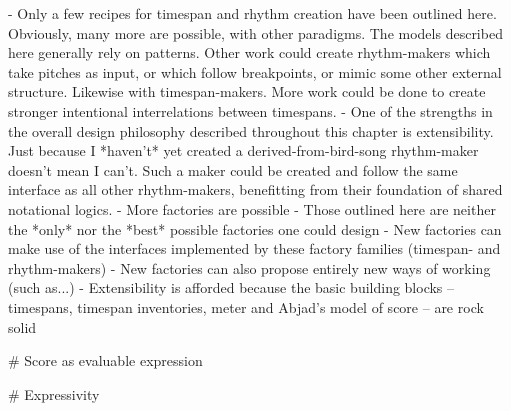 \begin{markdown}
- Only a few recipes for timespan and rhythm creation have been outlined
  here. Obviously, many more are possible, with other paradigms. The models
  described here generally rely on patterns. Other work could create
  rhythm-makers which take pitches as input, or which follow breakpoints, or
  mimic some other external structure. Likewise with timespan-makers. More
  work could be done to create stronger intentional interrelations between
  timespans.
- One of the strengths in the overall design philosophy described throughout
  this chapter is extensibility. Just because I *haven't* yet created a
  derived-from-bird-song rhythm-maker doesn't mean I can't. Such a maker
  could be created and follow the same interface as all other rhythm-makers,
  benefitting from their foundation of shared notational logics.
- More factories are possible
- Those outlined here are neither the *only* nor the *best* possible
  factories one could design
- New factories can make use of the interfaces implemented by these
  factory families (timespan- and rhythm-makers)
- New factories can also propose entirely new ways of working
  (such as...)
- Extensibility is afforded because the basic building blocks --
  timespans, timespan inventories, meter and Abjad's model of score --
  are rock solid

# Score as evaluable expression

# Expressivity

\end{markdown}
